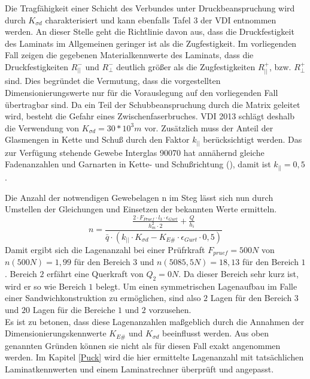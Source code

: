 Die Tragfähigkeit einer Schicht des Verbundes unter Druckbeanspruchung wird durch $ K_{\sigma d} $ charakterisiert und kann ebenfalls Tafel 3 der VDI entnommen werden. An dieser Stelle geht die Richtlinie davon aus, dass die Druckfestigkeit des Laminats im Allgemeinen geringer ist als die Zugfestigkeit. Im vorliegenden Fall zeigen die gegebenen Materialkennwerte des Laminats, dass die Druckfestigkeiten $ R_{||}^{-} $ und $ R_{\perp}^{-} $ deutlich größer als die Zugfestigkeiten $ R_{||}^{+} $, bzw. $ R_{\perp}^{+} $ sind. Dies begründet die Vermutung, dass die vorgestellten Dimensionierungswerte nur für die Vorauslegung auf den vorliegenden Fall übertragbar sind. Da ein Teil der Schubbeanspruchung durch die Matrix geleitet wird, besteht die Gefahr eines Zwischenfaserbruches. VDI 2013 schlägt deshalb die Verwendung von $ K_{\sigma d}=30*10^{3}m $ vor. Zusätzlich muss der Anteil der Glasmengen in Kette und Schuß durch den Faktor $ k_{||} $ berücksichtigt werden. Das zur Verfügung stehende Gewebe Interglas 90070 hat annähernd gleiche Fadenanzahlen und Garnarten in Kette- und Schußrichtung (\cite{item18}), damit ist $ k_{||}=0,5 $. 

Die Anzahl der notwendigen Gewebelagen n im Steg lässt sich nun durch Umstellen der Gleichungen und Einsetzen der bekannten Werte ermitteln.\\
\begin{equation}
	n=\frac{\frac{2\cdot F_{Pruef}\cdot l_{3}\cdot \epsilon_{Gurt}}{h_{m}^{2}\cdot 2}+\frac{Q}{h_{i}}}{\bar{q}\cdot \left(k_{||}\cdot K_{\sigma d}-K_{E\#}\cdot \epsilon_{Gurt}\cdot 0,5\right)}
\end{equation}
Damit ergibt sich die Lagenanzahl bei einer Prüfrkraft $ F_{pruef}=500N $ von $ n\left(500N\right)=1,99 $ für den Bereich $ 3 $ und $ n\left(5085,5N\right)=18,13 $ für den Bereich $ 1 $. Bereich $ 2 $ erfährt eine Querkraft von $Q_{2}=0N $. Da dieser Bereich sehr kurz ist, wird er so wie Bereich $ 1 $ belegt. Um einen symmetrischen Lagenaufbau im Falle einer Sandwichkonstruktion zu ermöglichen, sind also $ 2 $ Lagen für den Bereich $ 3 $ und $ 20 $ Lagen für die Bereiche $ 1 $ und $ 2 $ vorzusehen.\\

\noindent Es ist zu betonen, dass diese Lagenanzahlen maßgeblich durch die Annahmen der Dimensionierungskennwerte $ K_{E\#} $ und $ K_{\sigma d} $ beeinflusst werden. Aus oben genannten Gründen können sie nicht als für diesen Fall exakt angenommen werden. Im Kapitel \ref{Puck} wird die hier ermittelte Lagenanzahl mit tatsächlichen Laminatkennwerten und einem Laminatrechner überprüft und angepasst.\\

